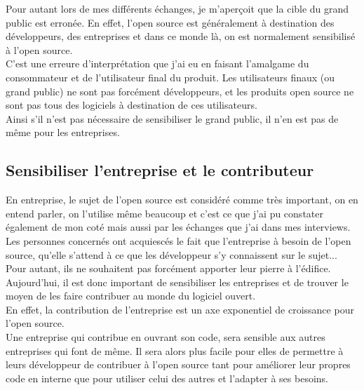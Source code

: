 		Pour autant lors de mes différents échanges, je m'aperçoit que la cible du grand public est erronée. En effet, l'open source est généralement à destination des développeurs, des entreprises et dans ce monde là, on est normalement sensibilisé à l'open source.\\

		C'est une erreure d'interprétation que j'ai eu en faisant l'amalgame du consommateur et de l'utilisateur final du produit. Les utilisateurs finaux (ou grand public) ne sont pas forcément développeurs, et les produits open source ne sont pas tous des logiciels à destination de ces utilisateurs.\\

		Ainsi s'il n'est pas nécessaire de sensibiliser le grand public, il n'en est pas de même pour les entreprises.

	\subsection{Sensibiliser l'entreprise et le contributeur}

		En entreprise, le sujet de l'open source est considéré comme très important, on en entend parler, on l'utilise même beaucoup et c'est ce que j'ai pu constater également de mon coté mais aussi par les échanges que j'ai dans mes interviews.\\

		Les personnes concernés ont acquiescés le fait que l'entreprise à besoin de l'open source, qu'elle s'attend à ce que les développeur s'y connaissent sur le sujet... Pour autant, ils ne souhaitent pas forcément apporter leur pierre à l'édifice.\\

		Aujourd'hui, il est donc important de sensibiliser les entreprises et de trouver le moyen de les faire contribuer au monde du logiciel ouvert.\\

		En effet, la contribution de l'entreprise est un axe exponentiel de croissance pour l'open source.\\

		Une entreprise qui contribue en ouvrant son code, sera sensible aux autres entreprises qui font de même. Il sera alors plus facile pour elles de permettre à leurs développeur de contribuer à l'open source tant pour améliorer leur propres code en interne que pour utiliser celui des autres et l'adapter à ses besoins.\\

